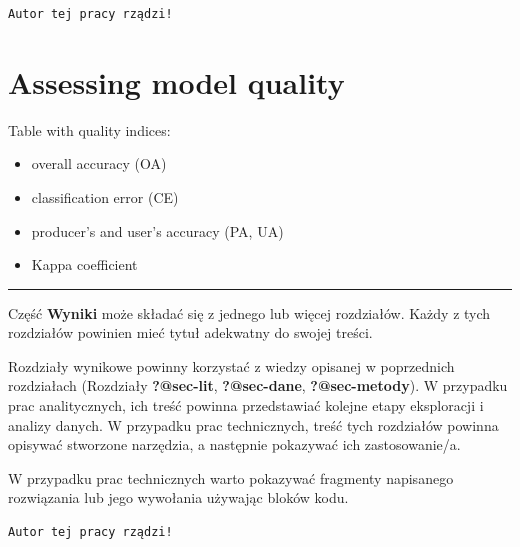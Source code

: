 \documentclass{amuthesis}
\begin{document}
\begin{verbatim}
Autor tej pracy rządzi!
\end{verbatim}


\hypertarget{sec-results-eval}{%
\chapter{Assessing model quality}\label{sec-results-eval}}

Table with quality indices:

\begin{itemize}
\item
  overall accuracy (OA)
\item
  classification error (CE)
\item
  producer's and user's accuracy (PA, UA)
\item
  Kappa coefficient
\end{itemize}

\begin{center}\rule{0.5\linewidth}{0.5pt}\end{center}

Część \textbf{Wyniki} może składać się z jednego lub więcej rozdziałów.
Każdy z tych rozdziałów powinien mieć tytuł adekwatny do swojej treści.

Rozdziały wynikowe powinny korzystać z wiedzy opisanej w poprzednich
rozdziałach (Rozdziały \textbf{?@sec-lit}, \textbf{?@sec-dane},
\textbf{?@sec-metody}). W przypadku prac analitycznych, ich treść
powinna przedstawiać kolejne etapy eksploracji i analizy danych. W
przypadku prac technicznych, treść tych rozdziałów powinna opisywać
stworzone narzędzia, a następnie pokazywać ich zastosowanie/a.

W przypadku prac technicznych warto pokazywać fragmenty napisanego
rozwiązania lub jego wywołania używając bloków kodu.

\begin{Shaded}
\begin{Highlighting}[]
\OtherTok{=} 
  \NormalTok{)}
\NormalTok{\}}
\NormalTok{(}\NormalTok{)}
\end{Highlighting}
\end{Shaded}

\begin{verbatim}
Autor tej pracy rządzi!
\end{verbatim}
\end{document}
